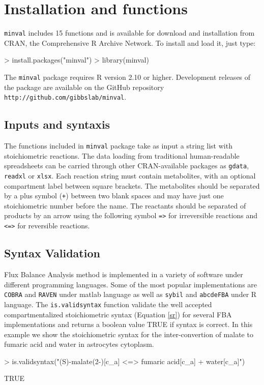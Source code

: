 \section{Installation and functions}
\texttt{minval} includes 15 functions and is available for download and installation from CRAN, the
Comprehensive R Archive Network. To install and load it, just type:
\begin{Schunk}
\begin{Sinput}
> install.packages("minval")
> library(minval)
\end{Sinput}
\end{Schunk}
The \texttt{minval} package requires R version 2.10 or higher. Development releases of the package are available on the GitHub repository \texttt{http://github.com/gibbslab/minval}.

\subsection*{Inputs and syntaxis}
The functions included in \texttt{minval} package take as input a string list with stoichiometric reactions. The data loading from traditional human-readable spreadsheets can be carried through other CRAN-available packages as \texttt{gdata}, \texttt{readxl} or \texttt{xlsx}. Each reaction string must contain metabolites, with an optional compartment label between square brackets. The metabolites should be separated by a plus symbol (\texttt{+}) between two blank spaces and may have just one stoichiometric number before the name. The reactants should be separated of products by an arrow using the following symbol \texttt{=>} for irreversible reactions and \texttt{<=>} for reversible reactions.
\subsection*{Syntax Validation}
Flux Balance Analysis method is implemented in a variety of software under different programming languages. Some of the most popular implementations are \texttt{COBRA} \cite{Becker2007} and \texttt{RAVEN} \cite{Agren2013} under matlab language as well as \texttt{sybil} and \texttt{abcdeFBA} under R language. The \texttt{is.validsyntax} function validate the well accepted compartmentalized stoichiometric syntax (Equation \ref{sr}) for several FBA implementations and returns a boolean value TRUE if syntax is correct. In this example we show the stoichiometric syntax for the inter-convertion of  malate to fumaric acid and water in astrocytes cytoplasm.
\begin{Schunk}
\begin{Sinput}
> is.validsyntax("(S)-malate(2-)[c_a] <=> fumaric acid[c_a] + water[c_a]")
\end{Sinput}
\begin{Soutput}
[1] TRUE
\end{Soutput}
\end{Schunk}
